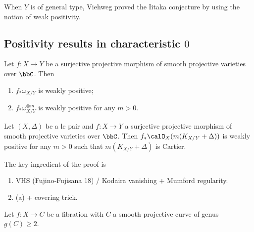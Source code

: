 When $Y$ is of general type, Viehweg proved the Iitaka conjecture by using the notion of weak positivity.


\subsection[Positivity results in characteristic 0]{Positivity results in characteristic $0$}

\begin{theorem}[Viehweg' 83]
	Let $f:X\to Y$ be a surjective projective morphism of smooth projective varieties over $\bbC$.
	Then
	\begin{enumerate}
		\item $f_*\omega_{X/Y}$ is weakly positive;
		\item $f_*\omega_{X/Y}^{\otimes m}$ is weakly positive for any $m>0$.
	\end{enumerate}
\end{theorem}

\begin{theorem}[Campana'04]
	Let $(X,\Delta)$ be a lc pair and $f:X\to Y$ a surjective projective morphism of smooth projective varieties over $\bbC$.
	Then $f_*\calO_X(m(K_{X/Y}+\Delta))$ is weakly positive for any $m>0$ such that $m(K_{X/Y}+\Delta)$ is Cartier.
	\Yang{}
\end{theorem}

The key ingredient of the proof is
\begin{enumerate}
	\item VHS (Fujino-Fujisana 18) / Kodaira vanishing + Mumford regularity.
	\item (a) + covering trick.
\end{enumerate}

\begin{example}
	Let $f: X \to C$ be a fibration with $C$ a smooth projective curve of genus $g(C) \ge 2$.
	\Yang{}
\end{example}
























